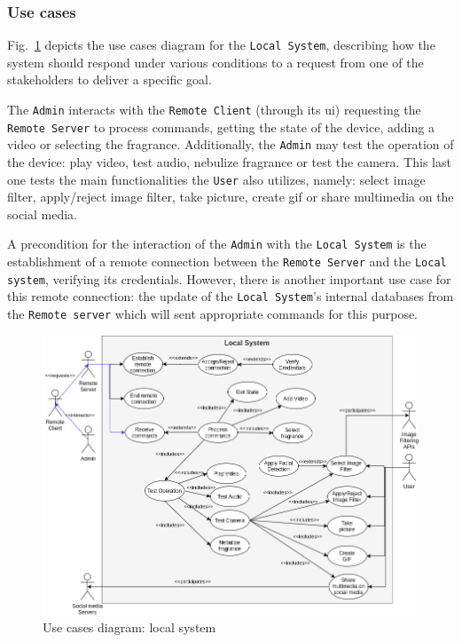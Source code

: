 \subsubsection{Use cases}
\label{sec:use-cases}
Fig.~\ref{fig:use-cases-local} depicts the use cases diagram for the
\texttt{Local System}, describing how the system should respond under various
conditions to a request from one of the stakeholders to deliver a specific
goal.

The \texttt{Admin} interacts with the \texttt{Remote Client} (through its
\gls{ui}) requesting the \texttt{Remote Server} to process commands, getting the
state of the device, adding a video or selecting the fragrance. Additionally,
the \texttt{Admin} may test the operation of the device: play video, test audio,
nebulize fragrance or test the camera. This last one tests the main
functionalities the \texttt{User} also utilizes, namely: select image filter,
apply/reject image filter, take picture, create \gls{gif} or share multimedia on
the social media.

A precondition for the interaction of the \texttt{Admin} with the \texttt{Local System} is the establishment of a remote
connection between the \texttt{Remote Server} and the \texttt{Local system},
verifying its credentials. However, there is another important use case for this
remote connection: the update of the \texttt{Local System}'s internal databases
from the \texttt{Remote server} which will sent appropriate commands for this purpose.
%
\begin{figure}[htb!]
\centering
    \includegraphics[width=0.85\columnwidth]{./img/use-cases-local.png}
  \caption{Use cases diagram: local system}%
\label{fig:use-cases-local}
\end{figure}
%
